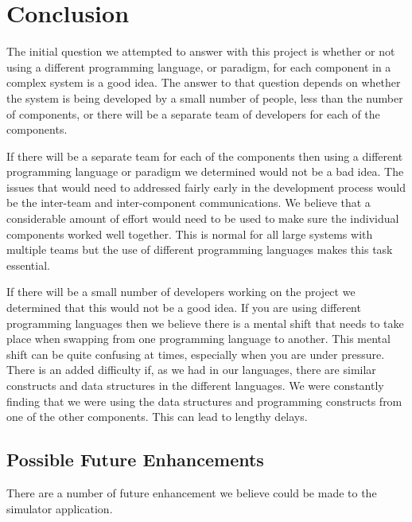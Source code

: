 \documentclass[a4paper,11pt]{report}
\begin{document}
\chapter*{Conclusion}
The initial question we attempted to answer with this project is whether or not using a different programming language, or paradigm, for each component in a complex system is a good idea. The answer to that question depends on whether the system is being developed by a small number of people, less than the number of components, or there will be a separate team of developers for each of the components.

If there will be a separate team for each of the components then using a different programming language or paradigm we determined would not be a bad idea. The issues that would need to addressed fairly early in the development process would be the inter-team and inter-component communications. We believe that a considerable amount of effort would need to be used to make sure the individual components worked well together. This is normal for all large systems with multiple teams but the use of different programming languages makes this task essential.

If there will be a small number of developers working on the project we determined that this would not be a good idea. If you are using different programming languages then we believe there is a mental shift that needs to take place when swapping from one programming language to another. This mental shift can be quite confusing at times, especially when you are under pressure. There is an added difficulty if, as we had in our languages, there are similar constructs and data structures in the different languages. We were constantly finding that we were using the data structures and programming constructs from one of the other components. This can lead to lengthy delays. 
\clearpage
\section*{Possible Future Enhancements}
There are a number of future enhancement we believe could be made to the simulator application.
\end{document}
